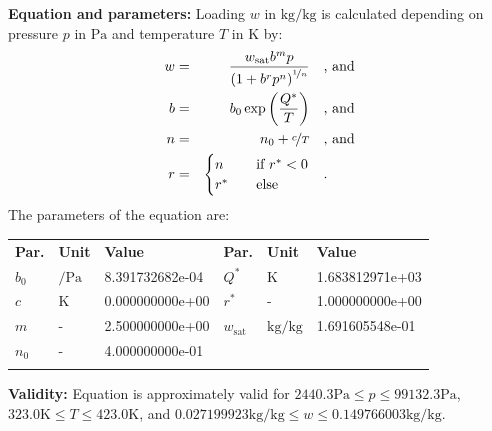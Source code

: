 \textbf{Equation and parameters:}
\newline
%
Loading $w$ in $\si{\kilogram\per\kilogram}$ is calculated depending on pressure $p$ in $\si{\pascal}$ and temperature $T$ in $\si{\kelvin}$ by:
%
\begin{equation*}
\begin{split}
w &=& \frac{w_\mathrm{sat} b^{m} p}{\left( 1 + b^{r} p^{n} \right)^{\nicefrac{1}{n}}} & \quad\text{, and} \\
b &=& b_0 \exp\left( \frac{Q^{*}}{T} \right) & \quad\text{, and} \\
n &=& n_0 + \nicefrac{c}{T} & \quad\text{, and} \\
r &=& \begin{cases} n & \quad \text{if } r^{*} < 0 \\ r^{*}  & \quad \text{else} \end{cases} & \quad\text{.}
\end{split}
\end{equation*}
%
The parameters of the equation are:
%
\begin{longtable}[l]{lll|lll}
\toprule
\addlinespace
\textbf{Par.} & \textbf{Unit} & \textbf{Value} &	\textbf{Par.} & \textbf{Unit} & \textbf{Value} \\
\addlinespace
\midrule
\endhead

\bottomrule
\endfoot
\bottomrule
\endlastfoot
\addlinespace

$b_0$ & $\si{\per\pascal}$ & 8.391732682e-04 & $Q^{*}$ & $\si{\kelvin}$ & 1.683812971e+03 \\
$c$ & $\si{\kelvin}$ & 0.000000000e+00 & $r^{*}$ & - & 1.000000000e+00 \\
$m$ & - & 2.500000000e+00 & $w_\mathrm{sat}$ & $\si{\kilogram\per\kilogram}$ & 1.691605548e-01 \\
$n_0$ & - & 4.000000000e-01 & & & \\

\addlinespace\end{longtable}

\textbf{Validity:}
\newline
Equation is approximately valid for $2440.3 \si{\pascal} \leq p \leq 99132.3 \si{\pascal}$,  $323.0 \si{\kelvin} \leq T \leq 423.0 \si{\kelvin}$, and $0.027199923 \si{\kilogram\per\kilogram} \leq w \leq 0.149766003 \si{\kilogram\per\kilogram}$.
\newline

